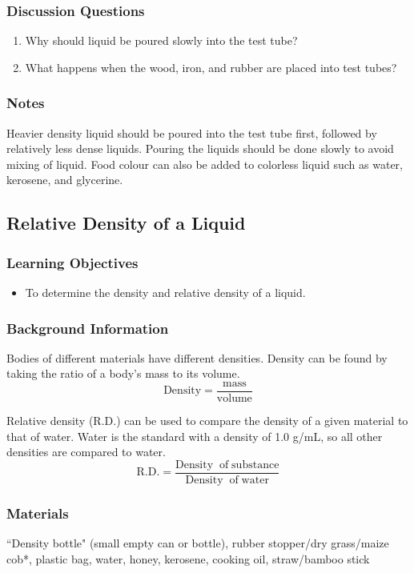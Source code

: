 \subsubsection*{Discussion Questions}
\begin{enumerate}
\item{Why should liquid be poured slowly into the test tube?}
\item{What happens when the wood, iron, and rubber are placed into test tubes?} 
\end{enumerate}

\subsubsection*{Notes}
Heavier density liquid should be poured into the test tube first, followed by relatively less dense liquids. Pouring the liquids should be done slowly to avoid mixing of liquid. Food colour can also be added to colorless liquid such as water, kerosene, and glycerine.  

\subsection{Relative Density of a Liquid}

\subsubsection*{Learning Objectives}
\begin{itemize}
\item{To determine the density and relative density of a liquid.} 
\end{itemize}

\subsubsection*{Background Information}
Bodies of different materials have different densities.  Density can be found by taking the ratio of a body's mass to its volume.  $$\mathrm{Density} = \frac{\mathrm{mass}}{\mathrm{volume}}$$

Relative density (R.D.) can be used to compare the density of a given material to that of water.  Water is the standard with a density of 1.0 g/mL, so all other densities are compared to water.
$$\mathrm{R.D.} = \frac{\mathrm{Density\; \; of \;substance}}{\mathrm{Density\; \;of \;water}}$$

\subsubsection*{Materials}
``Density bottle" (small empty can or bottle), rubber stopper/dry grass/maize cob*, plastic bag, water, honey, kerosene, cooking oil, straw/bamboo stick


